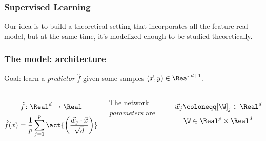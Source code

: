\documentclass{beamer}
\begin{document}
\hspace*{-1.2cm}
\begin{frame}[plain]
\titlepage %
\end{frame}

\begin{frame}
  \frametitle{Supervised Learning}
  Our idea is to build a theoretical setting that incorporates all the feature real model,
  but at the same time, it's modelized enough to be studied theoretically.
\end{frame}

\begin{frame}
\frametitle{The model: architecture}
Goal: learn a \emph{predictor} \(\hat{f}\) given some samples \((\vec{x},y)\in\Real^{d+1}\).
\vfill
\begin{columns}
    \vspace{1.5pt}

    \begin{tikzpicture}[x=1cm, y=.8cm, >=latex]
      
    \end{tikzpicture}
    \[\hat{f}\colon \Real^d\to\Real\]
    \[\hat{f}{(\vec{x})} = \frac{1}{p}\sum_{j=1}^{p} \act{\left(\frac{\vec{w}_j \cdot \vec{x}}{\sqrt{d}}\right)}\]
    \vspace{30pt}

    \begin{center}The network \emph{parameters} are\end{center} 
    \[\vec{w}_j \coloneqq [\W]_j \in \Real^d\]
    \[\W \in \Real^p\times\Real^d\]
\end{columns}
\end{frame}
\end{document}
